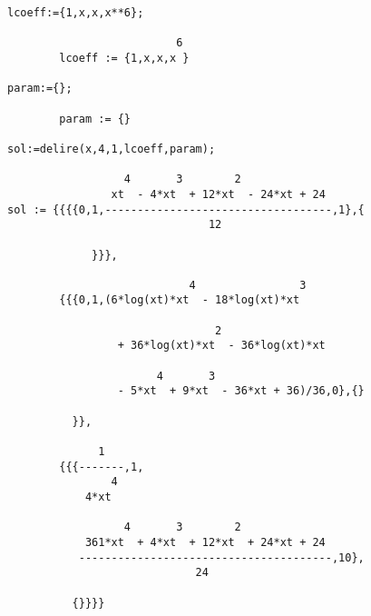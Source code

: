\begin{verbatim}
lcoeff:={1,x,x,x**6};

                          6
        lcoeff := {1,x,x,x }

param:={};

        param := {}

sol:=delire(x,4,1,lcoeff,param);

                  4       3        2
                xt  - 4*xt  + 12*xt  - 24*xt + 24
sol := {{{{0,1,-----------------------------------,1},{
                               12

             }}},

                            4                3
        {{{0,1,(6*log(xt)*xt  - 18*log(xt)*xt

                                2
                 + 36*log(xt)*xt  - 36*log(xt)*xt

                       4       3
                 - 5*xt  + 9*xt  - 36*xt + 36)/36,0},{}

          }},

              1
        {{{-------,1,
                4
            4*xt

                  4       3        2
            361*xt  + 4*xt  + 12*xt  + 24*xt + 24
           ---------------------------------------,10},
                             24

          {}}}}
\end{verbatim}

